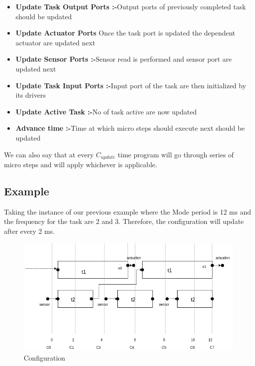 \documentclass[16pt]{report}
\begin{document}
 \begin{itemize}
     \item \textbf{Update Task Output Ports :-}Output ports of previously completed task should be updated
     \item \textbf{Update Actuator Ports }Once the task port is updated the dependent actuator are updated next
     \item \textbf{Update Sensor Ports :-}Sensor read is performed and sensor port are updated next
     \item \textbf{Update Task Input Ports :-}Input port of the task are then initialized by its drivers
     \item \textbf{Update Active Task :-}No of task active are now updated
     \item \textbf{Advance time :-}Time at which micro steps should execute next should be updated
 \end{itemize}

We can also say that at every $C_{update}$ time program will go through series of micro steps and will apply whichever is applicable.

\subsection{Example}
Taking the instance of our previous example where the Mode period is 12 ms and the frequency for the task are 2 and 3. Therefore, the configuration will update after every 2 ms.
\begin{figure}[H]
\centering
\includegraphics[width=\linewidth]{19config.png}
\caption{Configuration}
\end{figure}
\end{document}
